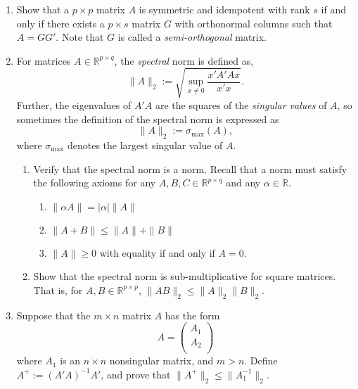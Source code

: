 \documentclass[11pt]{article}
\begin{document}
\begin{enumerate}
\item Show that a $p\times p$ matrix $A$ is symmetric and idempotent with rank $s$ if and only if there exists a $p\times s$ matrix $G$ with orthonormal columns such that $A = GG'$.  Note that $G$ is called a {\em semi-orthogonal} matrix.

\item For matrices $A \in \mathbb{R}^{p\times q}$, the \textit{spectral} norm is defined as,
\[
\|A\|_{2} := \sqrt{\sup_{x\ne0}\frac{x'A'Ax}{x'x}}.
\]
Further, the eigenvalues of $A'A$ are the squares of the \textit{singular values} of $A$, so sometimes the definition of the spectral norm is expressed as
 \[
\|A\|_{2} := \sigma_{\max}(A),
\]
where $\sigma_{\max}$ denotes the largest singular value of $A$. 
\begin{enumerate}
\item Verify that the spectral norm is a norm.  Recall that a norm must satisfy the following axioms for any $A,B,C \in \mathbb{R}^{p\times q}$ and any $\alpha \in \mathbb{R}$.
\begin{enumerate}
\item $\|\alpha A\| = |\alpha|\|A\|$
\item $\|A + B\| \le \|A\| + \|B\|$
\item $\|A\| \ge 0$ with equality if and only if $A = 0$.
\end{enumerate}
\item Show that the spectral norm is sub-multiplicative for square matrices.  That is, for $A,B \in \mathbb{R}^{p\times p}$, $\|AB\|_{2} \le \|A\|_{2}\|B\|_{2}$.  
\end{enumerate}

\item Suppose that the $m\times n$ matrix $A$ has the form 
\[
A = 
\begin{pmatrix}
A_{1} \\
A_{2} \\
\end{pmatrix}
\]
where $A_{1}$ is an $n\times n$ nonsingular matrix, and $m > n$.  Define $A^{+} := (A'A)^{-1}A'$, and prove that $\|A^{+}\|_{2} \le \|A_{1}^{-1}\|_{2}$.

\end{enumerate}
\end{document}
